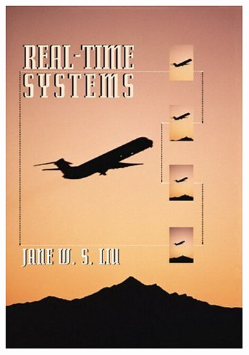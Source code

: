 \documentclass[dvipsnames,14pt,t]{beamer}
\begin{document}
\begin{frame}[c]
\begin{textblock}{11}
         {\includegraphics[scale=0.125]{pics/p2.jpg}}

\end{textblock}
\end{frame}
\end{document}
